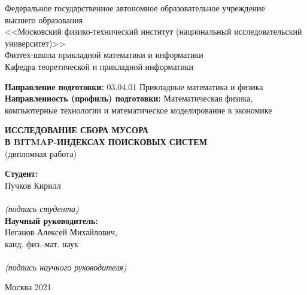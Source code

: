 \begin{center}
    Федеральное государственное автономное образовательное учреждение\\ 
    высшего образования\\
    <<Московский физико-технический институт (национальный исследовательский университет)>>\\
    Физтех-школа прикладной математики и информатики\\
    Кафедра теоретической и прикладной информатики\\
\end{center}

\vspace{2mm}

\begin{flushleft}
\textbf{Направление подготовки:} 03.04.01 Прикладные математика и физика\\
\textbf{Направленность (профиль) подготовки:} Математическая физика,\\компьютерные технологии и математическое моделирование в экономике\\
\end{flushleft}

\vspace{24mm}

\begin{center}
    \large{\textbf{ ИССЛЕДОВАНИЕ СБОРА МУСОРА\\В BITMAP-ИНДЕКСАХ ПОИСКОВЫХ СИСТЕМ}}\\
    (дипломная работа)\\
\end{center}

\vspace{20mm}

\hspace{90mm}
\begin{minipage}{0.4\textwidth}
\begin{flushleft}
\textbf{Студент:}\\Пучков Кирилл\\
\vspace{4mm}
\hrulefill\\
{\centering\scriptsize\textit{(подпись студента)}\\}
\textbf{Научный руководитель:}\\Неганов Алексей Михайлович,\\канд. физ.-мат. наук\\
\vspace{4mm}
\hrulefill\\
{\centering\scriptsize\textit{(подпись научного руководителя)}\\}
\end{flushleft}
\end{minipage}

\vspace*{\fill}

\begin{center}
Москва 2021
\end{center}

\thispagestyle{empty}